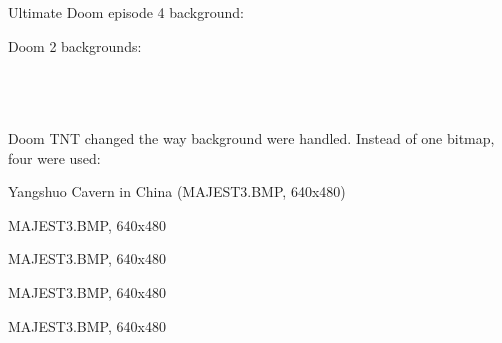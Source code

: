 Ultimate Doom episode 4 background:\\
\par
{}

Doom 2 backgrounds:\\
\par
\par
{}\\
\\
\\

Doom TNT changed the way background were handled. Instead of one bitmap, four were used:\\



\begin{minipage}{\textwidth}
\par
Yangshuo Cavern in China (MAJEST3.BMP, 640x480)\\
\par
{}
\end{minipage}
\par


\begin{minipage}{\textwidth}
\par
MAJEST3.BMP, 640x480\\
\par
{}
\end{minipage}
\par


\begin{minipage}{\textwidth}
\par
MAJEST3.BMP, 640x480\\
\par
{}
\end{minipage}

\par

\begin{minipage}{\textwidth}
\par
MAJEST3.BMP, 640x480\\
\par
{}
\end{minipage}


\begin{minipage}{\textwidth}
\par
MAJEST3.BMP, 640x480\\
\par
{}
\end{minipage}


